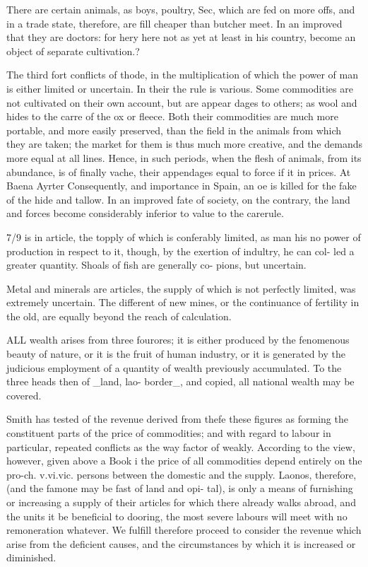\documentclass{article}
\begin{document}
There are certain animals, as boys, poultry, Sec, which are fed on more offs, and in a trade state, therefore, are fill cheaper than butcher meet. In an improved that they are doctors: for hery here not as yet at least in his country, become an object of separate cultivation.?

The third fort conflicts of thode, in the multiplication of which the power of man is either limited or uncertain. In their the rule is various. Some commodities are not cultivated on their own account, but are appear dages to others; as wool and hides to the carre of the ox or fleece. Both their commodities are much more portable, and more easily preserved, than the field in the animals from which they are taken; the market for them is thus much more creative, and the demands more equal at all lines. Hence, in such periods, when the flesh of animals, from its abundance, is of finally vache, their appendages equal to force if it in prices. At Baena Ayrter Consequently, and importance in Spain, an oe is killed for the fake of the hide and tallow. In an improved fate of society, on the contrary, the land and forces become considerably inferior to value to the carerule.

7/9 is in article, the topply of which is conferably limited, as man his no power of production in respect to it, though, by the exertion of indultry, he can col- led a greater quantity. Shoals of fish are generally co- pions, but uncertain.

Metal and minerals are articles, the supply of which is not perfectly limited, was extremely uncertain. The different of new mines, or the continuance of fertility in the old, are equally beyond the reach of calculation.

ALL wealth arises from three fourores; it is either produced by the fenomenous beauty of nature, or it is the fruit of human industry, or it is generated by the judicious employment of a quantity of wealth previously accumulated. To the three heads then of \_land, lao- border\_, and copied, all national wealth may be covered.

Smith has tested of the revenue derived from thefe these figures as forming the constituent parts of the price of commodities; and with regard to labour in particular, repeated conflicts as the way factor of weakly. According to the view, however, given above a Book i the price of all commodities depend entirely on the pro-ch. v.vi.vic. persons between the domestic and the supply. Laonos, therefore, (and the famone may be fast of land and opi- tal), is only a means of furnishing or increasing a supply of their articles for which there already walks abroad, and the units it be beneficial to dooring, the most severe labours will meet with no remoneration whatever. We fulfill therefore proceed to consider the revenue which arise from the deficient causes, and the circumstances by which it is increased or diminished.
\end{document}
